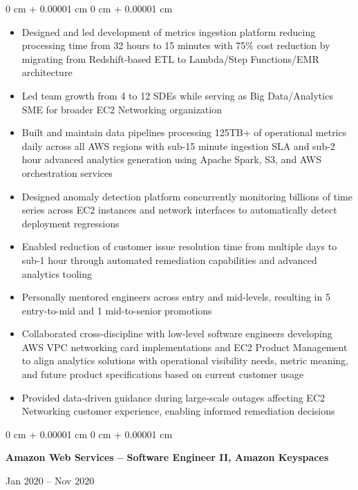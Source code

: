 \documentclass[10pt, letterpaper]{article}
\newenvironment{highlights}{
    \begin{itemize}[
        topsep=0.10 cm,
        parsep=0.10 cm,
        partopsep=0pt,
        itemsep=0pt,
        leftmargin=0 cm + 10pt
    ]
}{
    \end{itemize}
} %
\newenvironment{onecolentry}{
    \begin{adjustwidth}{
        0 cm + 0.00001 cm
    }{
        0 cm + 0.00001 cm
    }
}{
    \end{adjustwidth}
} %
\newenvironment{twocolentry}[2][]{
    \onecolentry
    \def\secondColumn{#2}
    \setcolumnwidth{\fill, 4.5 cm}
    \begin{paracol}{2}
}{
    \switchcolumn \raggedleft \secondColumn
    \end{paracol}
    \endonecolentry
} %
\begin{document}
        \vspace{0.10 cm}
        \begin{onecolentry}
            \begin{highlights}
                \item Designed and led development of metrics ingestion platform reducing processing time from 32 hours to 15 minutes with 75\% cost reduction by migrating from Redshift-based ETL to Lambda/Step Functions/EMR architecture
                \item Led team growth from 4 to 12 SDEs while serving as Big Data/Analytics SME for broader EC2 Networking organization
                \item Built and maintain data pipelines processing 125TB+ of operational metrics daily across all AWS regions with sub-15 minute ingestion SLA and sub-2 hour advanced analytics generation using Apache Spark, S3, and AWS orchestration services
                \item Designed anomaly detection platform concurrently monitoring billions of time series across EC2 instances and network interfaces to automatically detect deployment regressions
                \item Enabled reduction of customer issue resolution time from multiple days to sub-1 hour through automated remediation capabilities and advanced analytics tooling
                \item Personally mentored engineers across entry and mid-levels, resulting in 5 entry-to-mid and 1 mid-to-senior promotions
                \item Collaborated cross-discipline with low-level software engineers developing AWS VPC networking card implementations and EC2 Product Management to align analytics solutions with operational visibility needs, metric meaning, and future product specifications based on current customer usage
                \item Provided data-driven guidance during large-scale outages affecting EC2 Networking customer experience, enabling informed remediation decisions
            \end{highlights}
        \end{onecolentry}

        \vspace{0.2 cm}

        \begin{twocolentry}{
            Jan 2020 – Nov 2020
        }
            \textbf{Amazon Web Services – Software Engineer II, Amazon Keyspaces}
        \end{twocolentry}
\end{document}
